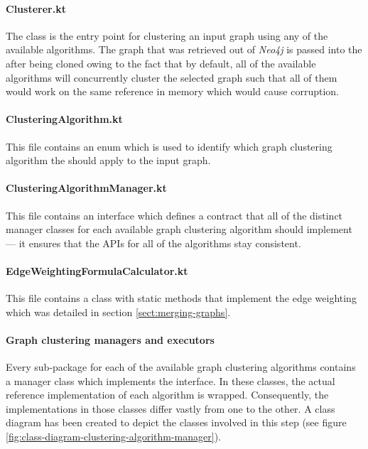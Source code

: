\documentclass[12pt,a4paper]{report}
\begin{document}
\paragraph{Clusterer.kt}
The  class is the entry point for clustering an input graph
using any of the available algorithms. The graph that was retrieved out of
\textit{Neo4j} is passed into the  after being cloned owing
to the fact that by default, all of the available algorithms will concurrently
cluster the selected graph such that all of them would work on the same
reference in memory which would cause corruption.

\paragraph{ClusteringAlgorithm.kt}
This file contains an enum which is used to identify which graph clustering
algorithm the  should apply to the input graph.

\paragraph{ClusteringAlgorithmManager.kt}
This file contains an interface which defines a contract that all of the
distinct manager classes for each available graph clustering algorithm
should implement --- it ensures that the APIs for all of the algorithms stay consistent.

\paragraph{EdgeWeightingFormulaCalculator.kt}
This file contains a class with static methods that implement the edge weighting
which was detailed in section \ref{sect:merging-graphs}.

\paragraph{Graph clustering managers and executors}
Every sub-package for each of the available graph clustering algorithms contains
a manager class which implements the  interface.
In these classes, the actual reference implementation of each algorithm is wrapped.
Consequently, the implementations in those classes differ vastly from one to the other.
A class diagram has been created to depict the classes involved in this step
(see figure \ref{fig:class-diagram-clustering-algorithm-manager}).
\end{document}

